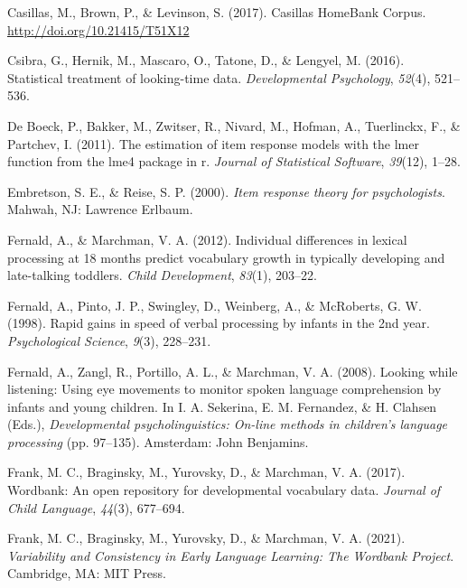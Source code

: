 \documentclass[10pt, letterpaper]{article}
\begin{document}
\leavevmode\hypertarget{ref-Casillas2017}{}%
Casillas, M., Brown, P., \& Levinson, S. (2017). Casillas HomeBank
Corpus. \url{http://doi.org/10.21415/T51X12}

\leavevmode\hypertarget{ref-Csibra2016}{}%
Csibra, G., Hernik, M., Mascaro, O., Tatone, D., \& Lengyel, M. (2016).
Statistical treatment of looking-time data. \emph{Developmental
Psychology}, \emph{52}(4), 521--536.

\leavevmode\hypertarget{ref-de-boeck2011}{}%
De Boeck, P., Bakker, M., Zwitser, R., Nivard, M., Hofman, A.,
Tuerlinckx, F., \& Partchev, I. (2011). The estimation of item response
models with the lmer function from the lme4 package in r. \emph{Journal
of Statistical Software}, \emph{39}(12), 1--28.

\leavevmode\hypertarget{ref-embretson2000}{}%
Embretson, S. E., \& Reise, S. P. (2000). \emph{Item response theory for
psychologists}. Mahwah, NJ: Lawrence Erlbaum.

\leavevmode\hypertarget{ref-Fernald2012a}{}%
Fernald, A., \& Marchman, V. A. (2012). Individual differences in
lexical processing at 18 months predict vocabulary growth in typically
developing and late-talking toddlers. \emph{Child Development},
\emph{83}(1), 203--22.

\leavevmode\hypertarget{ref-fernald1998}{}%
Fernald, A., Pinto, J. P., Swingley, D., Weinberg, A., \& McRoberts, G.
W. (1998). Rapid gains in speed of verbal processing by infants in the
2nd year. \emph{Psychological Science}, \emph{9}(3), 228--231.

\leavevmode\hypertarget{ref-Fernald2008}{}%
Fernald, A., Zangl, R., Portillo, A. L., \& Marchman, V. A. (2008).
Looking while listening: Using eye movements to monitor spoken language
comprehension by infants and young children. In I. A. Sekerina, E. M.
Fernandez, \& H. Clahsen (Eds.), \emph{Developmental psycholinguistics:
On-line methods in children's language processing} (pp. 97--135).
Amsterdam: John Benjamins.

\leavevmode\hypertarget{ref-Frank2016}{}%
Frank, M. C., Braginsky, M., Yurovsky, D., \& Marchman, V. A. (2017).
Wordbank: An open repository for developmental vocabulary data.
\emph{Journal of Child Language}, \emph{44}(3), 677--694.

\leavevmode\hypertarget{ref-frank2021}{}%
Frank, M. C., Braginsky, M., Yurovsky, D., \& Marchman, V. A. (2021).
\emph{Variability and Consistency in Early Language Learning: The
Wordbank Project}. Cambridge, MA: MIT Press.
\end{document}
